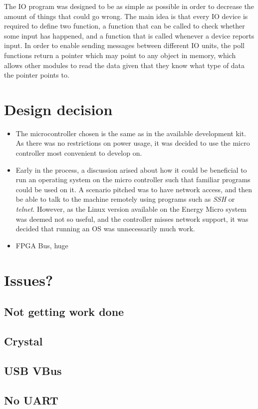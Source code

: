 The IO program was designed to be as simple as possible in order to decrease the amount of things that could go wrong.
The main idea is that every IO device is required to define two function, a function that can be called to check whether some input has happened, and a function that is called whenever a device reports input.
In order to enable sending messages between different IO units, the poll functions return a pointer which may point to any object in memory, which allows other modules to read the data given that they know what type of data the pointer points to.

\section{Design decision}
\begin{itemize}
    \item The microcontroller chosen is the same as in the available development kit. As there was no restrictions on power usage, 
          it was decided to use the micro controller most convenient to develop on.
    \item Early in the process, a discussion arised about how it could be beneficial to run an operating system on the micro controller
          such that familiar programs could be used on it. A scenario pitched was to have network access, and then be able to talk to the
          machine remotely using programs such as \textit{SSH} or \textit{telnet}. However, as the Linux version available on the Energy Micro
          system was deemed not so useful, and the controller misses network support, it was decided that running an OS was unnecessarily much work.
    \item FPGA Bus, huge
\end{itemize}

\section{Issues?}
\subsection{Not getting work done}

\subsection{Crystal}

\subsection{USB VBus}

\subsection{No UART}

